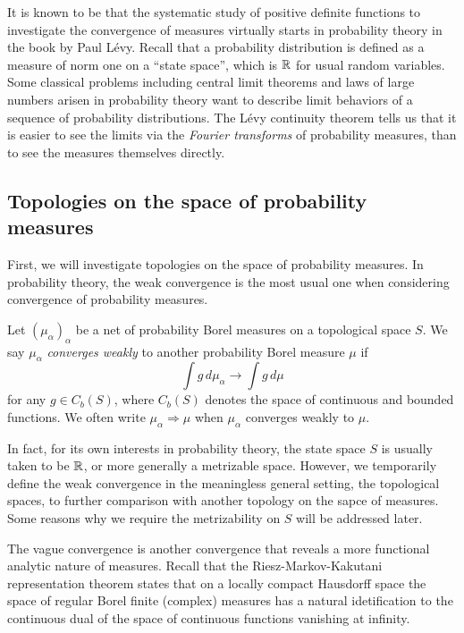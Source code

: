 \documentclass[a4paper]{article}
\begin{document}
It is known to be that the systematic study of positive definite functions to investigate the convergence of measures virtually starts in probability theory in the book \cite{levy1925calcul} by Paul L\'evy.
Recall that a probability distribution is defined as a measure of norm one on a ``state space'', which is $\mathbb{R}$ for usual random variables.
Some classical problems including central limit theorems and laws of large numbers arisen in probability theory want to describe limit behaviors of a sequence of probability distributions.
The L\'evy continuity theorem tells us that it is easier to see the limits via the \emph{Fourier transforms} of probability measures, than to see the measures themselves directly.


\subsection{Topologies on the space of probability measures}

First, we will investigate topologies on the space of probability measures.
In probability theory, the weak convergence is the most usual one when considering convergence of probability measures.

\begin{defn}
Let $(\mu_\alpha)_\alpha$ be a net of probability Borel measures on a topological space $S$.
We say $\mu_\alpha$ \emph{converges weakly} to another probability Borel measure $\mu$ if
\[\int g\,d\mu_\alpha\to\int g\,d\mu\]
for any $g\in C_b(S)$, where $C_b(S)$ denotes the space of continuous and bounded functions.
We often write $\mu_\alpha\Rightarrow\mu$ when $\mu_\alpha$ converges weakly to $\mu$.
\end{defn}

In fact, for its own interests in probability theory, the state space $S$ is usually taken to be $\mathbb{R}$, or more generally a metrizable space.
However, we temporarily define the weak convergence in the meaningless general setting, the topological spaces, to further comparison with another topology on the sapce of measures.
Some reasons why we require the metrizability on $S$ will be addressed later.

The vague convergence is another convergence that reveals a more functional analytic nature of measures.
Recall that the Riesz-Markov-Kakutani representation theorem states that on a locally compact Hausdorff space the space of regular Borel finite (complex) measures has a natural idetification to the continuous dual of the space of continuous functions vanishing at infinity.
\end{document}
